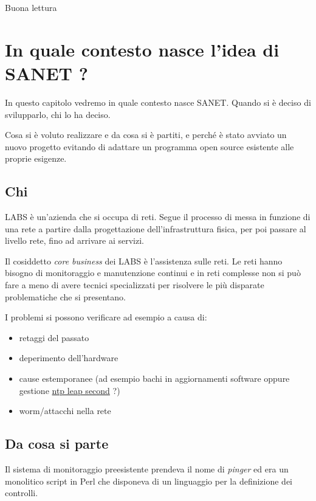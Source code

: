 \documentclass[a4wide,10pt,italian]{manual}
\begin{document}
Buona lettura

\resetcurrentobjects
\hypertarget{--doc-context}{}

\chapter{In quale contesto nasce l'idea di SANET ?}

In questo capitolo vedremo in quale contesto nasce SANET.
Quando si è deciso di svilupparlo, chi lo ha deciso.

Cosa si è voluto realizzare e da cosa si è partiti,
e perché è stato avviato un nuovo progetto evitando di
adattare un programma open source esistente alle proprie esigenze.


\section{Chi}

LABS è un'azienda che si occupa di reti. Segue il processo di messa in funzione di una rete
a partire dalla progettazione dell'infrastruttura fisica, per poi passare al livello rete,
fino ad arrivare ai servizi.

Il cosiddetto \emph{core business} dei LABS è l'assistenza sulle reti. Le reti hanno bisogno
di monitoraggio e manutenzione continui e in reti complesse non si può fare a meno
di avere tecnici specializzati per risolvere le più disparate problematiche che si presentano.

I problemi si possono verificare ad esempio a causa di:
\begin{itemize}
\item {} 
retaggi del passato

\item {} 
deperimento dell'hardware

\item {} 
cause estemporanee (ad esempio bachi in aggiornamenti software oppure gestione \href{http://www.meinberg.de/english/info/leap-second.htm}{ntp leap second} ?)

\item {} 
worm/attacchi nella rete

\end{itemize}


\section{Da cosa si parte}

Il sistema di monitoraggio preesistente prendeva il nome di \emph{pinger} ed era un monolitico script in Perl
che disponeva di un linguaggio per la definizione dei controlli.
\end{document}
